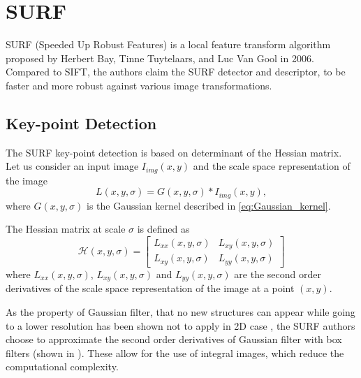 \section{SURF}
SURF (Speeded Up Robust Features) is a local feature transform algorithm proposed by Herbert Bay, Tinne Tuytelaars, and Luc Van Gool in 2006\cite{Bay2006}. Compared to SIFT\cite{Lowe1999}, the authors claim the SURF detector and descriptor, to be faster and more robust against various image transformations.

\subsection{Key-point Detection}
The SURF key-point detection is based on determinant of the Hessian matrix. Let us consider an input image $I_{img}(x,y)$ and the scale space representation of the image
\begin{equation}
    L(x, y,\sigma) =  G(x,y,\sigma)*I_{img}(x,y),
\end{equation}
where $G(x,y,\sigma)$ is the Gaussian kernel described in \eqref{eq:Gaussian_kernel}.

The Hessian matrix at scale $\sigma$ is defined as
\begin{equation}
    \mathcal{H}(x, y, \sigma) =
    \begin{bmatrix}
        L_{xx}(x, y, \sigma) & L_{xy}(x, y, \sigma)\\
        L_{xy}(x, y, \sigma) & L_{yy}(x, y, \sigma)
    \end{bmatrix}
\end{equation}
where $L_{xx}(x, y, \sigma)$, $L_{xy}(x, y, \sigma)$ and $L_{yy}(x, y, \sigma)$ are the second order derivatives of the scale space representation of the image at a point $(x, y)$.

As the property of Gaussian filter, that no new structures can appear while going to a lower resolution has been shown not to apply in 2D case \cite{Koenderink1984}, the SURF authors choose to approximate the second order derivatives of Gaussian filter with box filters (shown in ). These allow for the use of integral images, which reduce the computational complexity.

